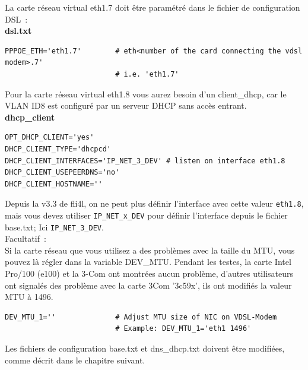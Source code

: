 \noindent La carte réseau virtual eth1.7 doit être paramétré dans le fichier de configuration DSL~:\\

\noindent \textbf{dsl.txt}

\begin{example}
\begin{verbatim}
PPPOE_ETH='eth1.7'        # eth<number of the card connecting the vdsl modem>.7'
                          # i.e. 'eth1.7'
\end{verbatim}
\end{example}

\noindent Pour la carte réseau virtual eth1.8 vous aurez besoin d'un client\_dhcp, car le VLAN ID8
est configuré par un serveur DHCP sans accès entrant.\\

\noindent \textbf{dhcp\_client}

\begin{example}
\begin{verbatim}
OPT_DHCP_CLIENT='yes'
DHCP_CLIENT_TYPE='dhcpcd'
DHCP_CLIENT_INTERFACES='IP_NET_3_DEV' # listen on interface eth1.8
DHCP_CLIENT_USEPEERDNS='no'
DHCP_CLIENT_HOSTNAME=''
\end{verbatim}
\end{example}

Depuis la v3.3 de fli4l, on ne peut plus définir l'interface avec cette valeur \texttt{eth1.8},
mais vous devez utiliser \texttt{IP\_NET\_x\_DEV} pour définir l'interface depuis le fichier
base.txt; Ici \texttt{IP\_NET\_3\_DEV}.\\

\noindent Facultatif~:\\
Si la carte réseau que vous utilisez a des problèmes avec la taille du MTU, vous pouvez là régler
dans la variable DEV\_MTU. Pendant les testes, la carte Intel Pro/100 (e100) et la 3-Com ont montrées
aucun problème, d'autres utilisateurs ont signalés des problème avec la carte 3Com '3c59x', ils ont
modifiés la valeur MTU à 1496.

\begin{example}
\begin{verbatim}
DEV_MTU_1=''              # Adjust MTU size of NIC on VDSL-Modem
                          # Example: DEV_MTU_1='eth1 1496'
\end{verbatim}
\end{example}

Les fichiers de configuration base.txt et dns\_dhcp.txt doivent être modifiées, comme décrit dans
le chapitre suivant.\\

